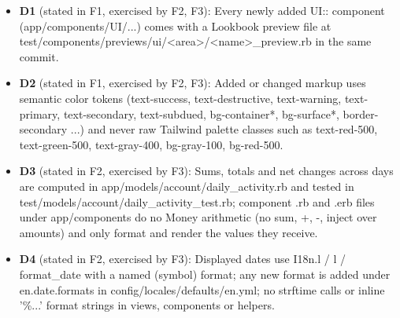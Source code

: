 \begin{itemize}[nosep]
\item \textbf{D1} (stated in F1, exercised by F2, F3): Every newly added UI:: component (app/components/UI/...) comes with a Lookbook preview file at test/components/previews/ui/<area>/<name>\_preview.rb in the same commit.
\item \textbf{D2} (stated in F1, exercised by F2, F3): Added or changed markup uses semantic color tokens (text-success, text-destructive, text-warning, text-primary, text-secondary, text-subdued, bg-container*, bg-surface*, border-secondary ...) and never raw Tailwind palette classes such as text-red-500, text-green-500, text-gray-400, bg-gray-100, bg-red-500.
\item \textbf{D3} (stated in F2, exercised by F3): Sums, totals and net changes across days are computed in app/models/account/daily\_activity.rb and tested in test/models/account/daily\_activity\_test.rb; component .rb and .erb files under app/components do no Money arithmetic (no sum, +, -, inject over amounts) and only format and render the values they receive.
\item \textbf{D4} (stated in F2, exercised by F3): Displayed dates use I18n.l / l / format\_date with a named (symbol) format; any new format is added under en.date.formats in config/locales/defaults/en.yml; no strftime calls or inline '\%...' format strings in views, components or helpers.
\end{itemize}
